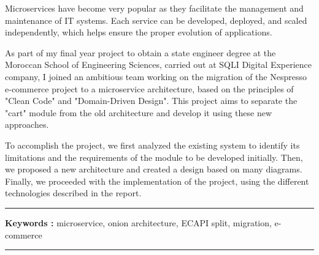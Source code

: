 Microservices have become very popular as they facilitate the management and maintenance of IT systems. Each service can be developed, deployed, and scaled independently, which helps ensure the proper evolution of applications.

As part of my final year project to obtain a state engineer degree at the Moroccan School of Engineering Sciences, carried out at SQLI Digital Experience company, I joined an ambitious team working on the migration of the Nespresso e-commerce project to a microservice architecture, based on the principles of "Clean Code" and "Domain-Driven Design". This project aims to separate the "cart" module from the old architecture and develop it using these new approaches.

To accomplish the project, we first analyzed the existing system to identify its limitations and the requirements of the module to be developed initially. Then, we proposed a new architecture and created a design based on many diagrams. Finally, we proceeded with the implementation of the project, using the different technologies described in the report.

\vspace{1cm}



\noindent\rule[2pt]{\textwidth}{0.5pt}

{\textbf{Keywords :}}
microservice, onion architecture, ECAPI split, migration, e-commerce
\\
\noindent\rule[2pt]{\textwidth}{0.5pt}
